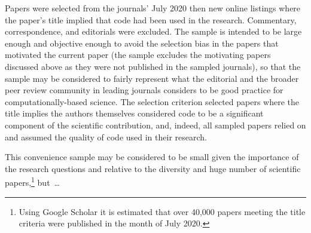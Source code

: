\documentclass[10pt,a4paper]{article}
\begin{document}
Papers were selected from the journals' July 2020 then new online listings where the paper's title implied that code had been used in the research. Commentary, correspondence, and editorials were excluded. The sample is intended to be large enough and objective enough to avoid the selection bias in the papers that motivated the current paper (the sample excludes the motivating papers discussed above as they were not published in the sampled journals), so that the sample may be considered to fairly represent what the editorial and the broader peer review community in leading journals considers to be good practice for computationally-based science. The selection criterion selected papers where the title implies the authors themselves considered code to be a significant component of the scientific contribution, and, indeed, all sampled papers relied on and assumed the quality of code used in their research. 


This convenience sample may be considered to be small given the importance of the research questions and relative to the diversity and huge number of scientific papers,\footnote{Using Google Scholar it is estimated that over 40,000 papers meeting the title criteria were published in the month of July 2020.} but~\ldots
\end{document}
